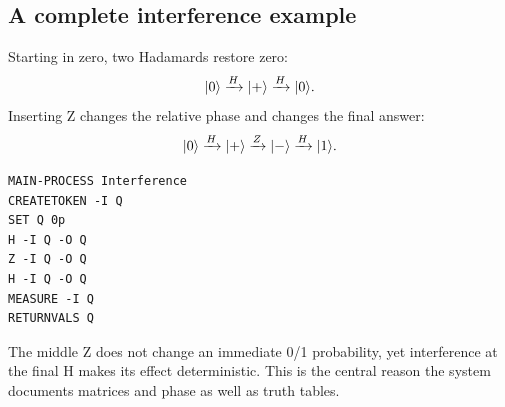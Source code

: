 \subsection{A complete interference example}

Starting in zero, two Hadamards restore zero:
\[
\lvert 0\rangle\xrightarrow{H}\lvert +\rangle
\xrightarrow{H}\lvert 0\rangle.
\]
Inserting Z changes the relative phase and changes the final answer:
\[
\lvert 0\rangle\xrightarrow{H}\lvert +\rangle
\xrightarrow{Z}\lvert -\rangle
\xrightarrow{H}\lvert 1\rangle.
\]
\begin{lstlisting}
MAIN-PROCESS Interference
CREATETOKEN -I Q
SET Q 0p
H -I Q -O Q
Z -I Q -O Q
H -I Q -O Q
MEASURE -I Q
RETURNVALS Q
\end{lstlisting}
The middle Z does not change an immediate 0/1 probability, yet interference at
the final H makes its effect deterministic. This is the central reason the
system documents matrices and phase as well as truth tables.

